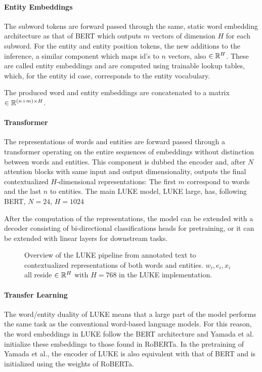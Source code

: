\documentclass[main.tex]{subfiles}
\begin{document}
\paragraph{Entity Embeddings}
The subword tokens are forward passed through the same, static word embedding architecture as that of BERT which outputs $m$ vectors of dimension $H$ for each subword.
For the entity and entity position tokens, the new additions to the inference, a similar component which maps id's to $n$ vectors, also $\in \mathbb R^H$.
These are called entity embeddings and are computed using trainable lookup tables, which, for the entity id case, corresponds to the entity vocabulary.

The produced word and entity embeddings are concatenated to a matrix $\in \mathbb R^{(n+m)\times H}$.

\paragraph{Transformer}
The representations of words and entities are forward passed through a transformer operating on the entire sequences of embeddings without distinction between words and entities.
This component is dubbed the encoder and, after $N$ attention blocks with same input and output dimensionality, outputs the final contextualized $H$-dimensional representations:
The first $m$ correspond to words and the last $n$ to entities.
The main LUKE model, LUKE large, has, following BERT, $N=24$, $H=1024$

After the computation of the representations, the model can be extended with a decoder consisting of bi-directional classifications heads for pretraining, or it can be extended with linear layers for downstream tasks.
\begin{figure}[H]
    \centering
        
    \caption{
        Overview of the LUKE pipeline from annotated text to contextualized representations of both words and entities.
        $w_i, e_i, x_i$ all reside $\in \mathbb R^H$ with $H=768$ in the LUKE implementation.
    }
    \label{fig:luke}
\end{figure}\noindent

\paragraph{Transfer Learning}
The word/entity duality of LUKE means that a large part of the model performs the same task as the conventional word-based language models.
For this reason, the word embeddings in LUKE follow the BERT architecture and Yamada et al. initialize these embeddings to those found in RoBERTa.
In the pretraining of Yamada et al., the encoder of LUKE is also equivalent with that of BERT and is initialized using the weights of RoBERTa.
\end{document}
